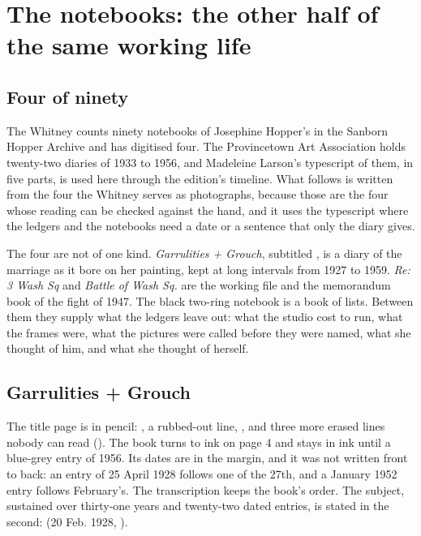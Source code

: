 \chapter{The notebooks: the other half of the same working life}

\section{Four of ninety}

The Whitney counts ninety notebooks of Josephine Hopper's in the Sanborn Hopper Archive and has digitised four. The Provincetown Art Association holds twenty-two diaries of 1933 to 1956, and Madeleine Larson's typescript of them, in five parts, is used here through the edition's timeline. What follows is written from the four the Whitney serves as photographs, because those are the four whose reading can be checked against the hand, and it uses the typescript where the ledgers and the notebooks need a date or a sentence that only the diary gives.

The four are not of one kind. \emph{Garrulities + Grouch}, subtitled , is a diary of the marriage as it bore on her painting, kept at long intervals from 1927 to 1959. \emph{Re: 3 Wash Sq} and \emph{Battle of Wash Sq.} are the working file and the memorandum book of the fight of 1947. The black two-ring notebook is a book of lists. Between them they supply what the ledgers leave out: what the studio cost to run, what the frames were, what the pictures were called before they were named, what she thought of him, and what she thought of herself.

\section{Garrulities + Grouch}

The title page is in pencil: , a rubbed-out line, , and three more erased lines nobody can read (). The book turns to ink on page 4 and stays in ink until a blue-grey entry of 1956. Its dates are in the margin, and it was not written front to back: an entry of 25 April 1928 follows one of the 27th, and a January 1952 entry follows February's. The transcription keeps the book's order. The subject, sustained over thirty-one years and twenty-two dated entries, is stated in the second:  (20 Feb. 1928, ).


